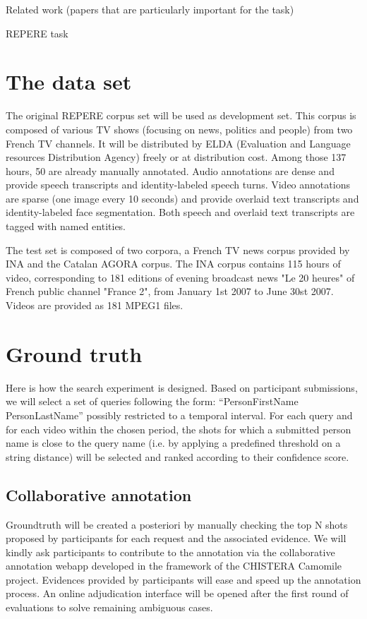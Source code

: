 \documentclass{acm_proc_article-me}
\begin{document}
Related work (papers that are particularly important for the task)

REPERE task


\section{The data set}

The original REPERE corpus set will be used as development set. This corpus is composed of various TV shows (focusing on news, politics and people) from two French TV channels. It will be distributed by ELDA (Evaluation and Language resources Distribution Agency) freely or at distribution cost. Among those 137 hours, 50 are already manually annotated. Audio annotations are dense and provide speech transcripts and identity-labeled speech turns. Video annotations are sparse (one image every 10 seconds) and provide overlaid text transcripts and identity-labeled face segmentation. Both speech and overlaid text transcripts are tagged with named entities.

The test set is composed of two corpora, a French TV news corpus provided by INA and the Catalan AGORA corpus. The INA corpus contains 115 hours of video, corresponding to 181 editions of evening broadcast news "Le 20 heures" of French public channel "France 2", from January 1st 2007 to June 30st 2007. Videos are provided as 181 MPEG1 files.


\section{Ground truth}

Here is how the search experiment is designed. Based on participant submissions, we will select a set of queries following the form: “PersonFirstName PersonLastName” possibly restricted to a temporal interval. For each query and for each video within the chosen period, the shots for which a submitted person name is close to the query name (i.e. by applying a predefined threshold on a string distance) will be selected and ranked according to their confidence score.

\subsection{Collaborative annotation}

Groundtruth will be created a posteriori by manually checking the top N shots proposed by participants for each request and the associated evidence. We will kindly ask participants to contribute to the annotation via the collaborative annotation webapp developed in the framework of the CHISTERA Camomile project. Evidences provided by participants will ease and speed up the annotation process. An online adjudication interface will be opened after the first round of evaluations to solve remaining ambiguous cases.
\end{document}

